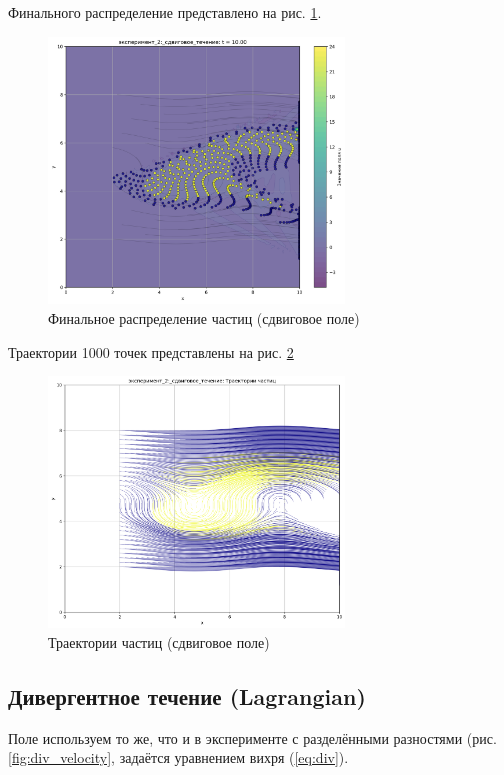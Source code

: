 Финального распределение представлено на рис. \ref{fig:lg_shaer_finall}.
\begin{figure}
	\centering
	\includegraphics[width=0.7\textwidth]{imgs/lg/эксперимент_2:_сдвиговое_течение_t10.00.png}
	\caption{Финальное распределение частиц (сдвиговое поле)}
	\label{fig:lg_shaer_finall}
\end{figure}
Траектории 1000 точек представлены на рис. \ref{fig:lg_shaer_tr}
\begin{figure}
	\centering
	\includegraphics[width=0.7\textwidth]{imgs/lg/эксперимент_2:_сдвиговое_течение_trajectories.png}
	\caption{Траектории частиц (сдвиговое поле)}
	\label{fig:lg_shaer_tr}
\end{figure}

\newpage
\subsection{Дивергентное течение (Lagrangian)}
Поле используем то же, что и в эксперименте с разделёнными разностями (рис. \ref{fig:div_velocity},  задаётся уравнением вихря (\ref{eq:div}).


